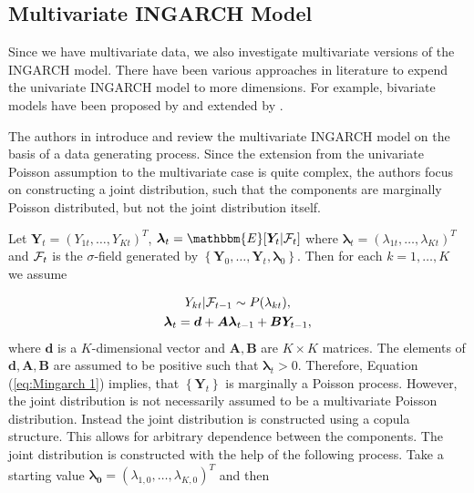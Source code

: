 \subsection{Multivariate INGARCH Model}
\label{sec: Multivariate Ingarch}

Since we have multivariate data, we also investigate multivariate versions of the INGARCH model. There have been various approaches in literature to expend the univariate INGARCH model to more dimensions. For example, bivariate models have been proposed by \textcite{Liu:2012} and  extended by \textcite{Cui:2018}. 

The authors in \textcite{Fokianos:2020,Fokianos:2021} introduce and review the multivariate INGARCH model on the basis of a data generating process. Since the extension from the univariate Poisson assumption to the multivariate case is quite complex, the authors focus on constructing a joint distribution, such that the components are marginally Poisson distributed, but not the joint distribution itself. 

Let $\bm{Y}_t=(Y_{1t},\ldots,Y_{Kt})^T$, $\bm{\lambda}_t=\mathbbm{E}[\bm{Y}_t|\SigA_t]$ where $\bm{\lambda}_t = (\lambda_{1t},\ldots,\lambda_{Kt})^T$ and $\mathcal{F}_t$ is the $\sigma$-field generated by $\left\{\bm{Y}_0,\ldots,\bm{Y}_t,\bm{\lambda}_0\right\}$. Then for each $k=1,\ldots,K$ we assume

\begin{equation}
\begin{gathered}
Y_{kt} | \mathcal{F}_{t-1} \sim P(\lambda_{kt}), \\
\bm{\lambda}_t = \bm{d} + \bm{A}\bm{\lambda}_{t-1} + \bm{B}\bm{Y}_{t-1},
\label{eq:Mingarch 1}
\end{gathered}
\end{equation}
%
where $\bm{d}$ is a $K$-dimensional vector and $\bm{A},\bm{B}$ are $K\times K$ matrices. The elements of $\bm{d},\bm{A},\bm{B}$ are assumed to be positive such that $\bm{\lambda}_t > 0$. Therefore, Equation (\ref{eq:Mingarch 1}) implies, that $\left\{\bm{Y}_t\right\}$ is marginally a Poisson process. However, the joint distribution is not necessarily assumed to be a multivariate Poisson distribution. Instead the joint distribution is constructed using a copula structure. This allows for arbitrary dependence between the components. The joint distribution is constructed with the help of the following process. Take a starting value $\bm{\lambda_0}=(\lambda_{1,0},\ldots,\lambda_{K,0})^T$ and then

